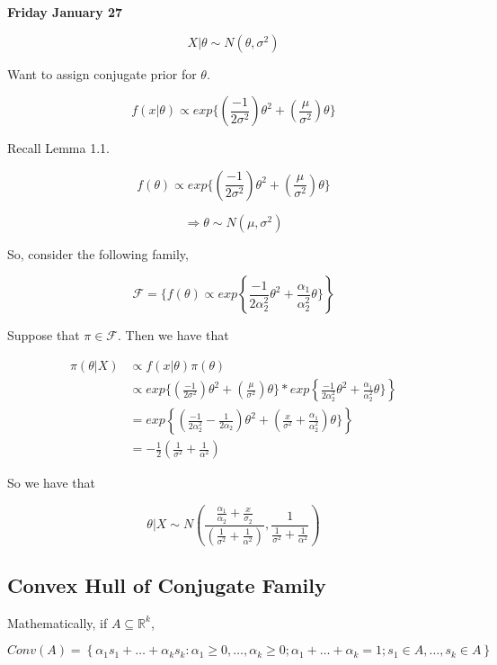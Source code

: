 \documentclass[11pt,fleqn]{book} %
\begin{document}
\textbf{Friday January 27}\\

\begin{example}
			$$X|\theta \sim N(\theta, \sigma^2) $$

	Want to assign conjugate prior for $\theta$. 

			$$f(x|\theta) \propto exp\{(\frac{-1}{2\sigma^2})\theta^2 + (\frac{\mu}{\sigma^2})\theta\} $$


	Recall Lemma 1.1. 

			$$ f(\theta) \propto exp\{(\frac{-1}{2\sigma^2})\theta^2 + (\frac{\mu}{\sigma^2})\theta\} $$

			$$\Rightarrow \theta \sim N(\mu, \sigma^2) $$

	So, consider the following family, 

			$$\mathcal{F} = \{f(\theta) \propto exp\left\{\frac{-1}{2\alpha_2^2}\theta^2 + \frac{\alpha_1}{\alpha_2^2}\theta\} \right\} $$

	Suppose that $\pi \in \mathcal{F}$. Then we have that

			\begin{align*}
				\pi(\theta|X) &\propto f(x|\theta) \pi(\theta)\\
					&\propto exp\{(\frac{-1}{2\sigma^2})\theta^2 + (\frac{\mu}{\sigma^2})\theta\} *  exp\left\{\frac{-1}{2\alpha_2^2}\theta^2 + \frac{\alpha_1}{\alpha_2^2}\theta\} \right\}\\
					&= exp\left\{(\frac{-1}{2\alpha_2^2} - \frac{1}{2\alpha_2})\theta^2 + (\frac{x}{\sigma^2} + \frac{\alpha_1}{\alpha_2^2})\theta\} \right\} \\
					&= - \frac{1}{2}(\frac{1}{\sigma^2} + \frac{1}{\alpha^2})
			\end{align*}

	So we have that 

		$$\theta|X \sim N(\frac{\frac{\alpha_1}{\alpha_2} + \frac{x}{\sigma_2}}{(\frac{1}{\sigma^2} + \frac{1}{\alpha^2})}, \frac{1}{\frac{1}{\sigma^2} + \frac{1}{\alpha^2}}) $$

\end{example}
	\subsection{Convex Hull of Conjugate Family}

	\begin{remark}

	Mathematically,  if $A \subseteq \mathbb{R}^k$,
		
		$$Conv(A) = \left\{\alpha_1 s_1 + \dots + \alpha_k s_k: \alpha_1 \geq 0, \dots, \alpha_k \geq 0; \alpha_1 + \dots + \alpha_k = 1; s_1 \in A, \dots, s_k \in A \right\} $$
	\end{remark}
\end{document}
